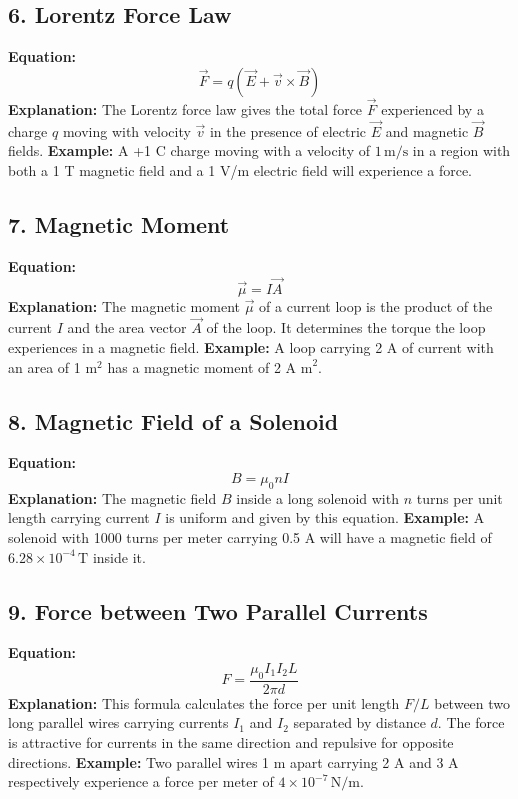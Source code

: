 \documentclass{article}
\begin{document}
\subsection*{6. Lorentz Force Law}
\textbf{Equation:} 
\[ \vec{F} = q(\vec{E} + \vec{v} \times \vec{B}) \]
\textbf{Explanation:} 
The Lorentz force law gives the total force \( \vec{F} \) experienced by a charge \( q \) moving with velocity \( \vec{v} \) in the presence of electric \( \vec{E} \) and magnetic \( \vec{B} \) fields.
\textbf{Example:}
A +1 C charge moving with a velocity of \( 1 \, \text{m/s} \) in a region with both a 1 T magnetic field and a 1 V/m electric field will experience a force.

\subsection*{7. Magnetic Moment}
\textbf{Equation:} 
\[ \vec{\mu} = I\vec{A} \]
\textbf{Explanation:} 
The magnetic moment \( \vec{\mu} \) of a current loop is the product of the current \( I \) and the area vector \( \vec{A} \) of the loop. It determines the torque the loop experiences in a magnetic field.
\textbf{Example:}
A loop carrying 2 A of current with an area of 1 \( \text{m}^2 \) has a magnetic moment of 2 \( \text{A m}^2 \).

\subsection*{8. Magnetic Field of a Solenoid}
\textbf{Equation:} 
\[ B = \mu_0 n I \]
\textbf{Explanation:} 
The magnetic field \( B \) inside a long solenoid with \( n \) turns per unit length carrying current \( I \) is uniform and given by this equation.
\textbf{Example:}
A solenoid with 1000 turns per meter carrying 0.5 A will have a magnetic field of \( 6.28 \times 10^{-4} \, \text{T} \) inside it.

\subsection*{9. Force between Two Parallel Currents}
\textbf{Equation:} 
\[ F = \frac{\mu_0 I_1 I_2 L}{2\pi d} \]
\textbf{Explanation:} 
This formula calculates the force per unit length \( F/L \) between two long parallel wires carrying currents \( I_1 \) and \( I_2 \) separated by distance \( d \). The force is attractive for currents in the same direction and repulsive for opposite directions.
\textbf{Example:}
Two parallel wires 1 m apart carrying 2 A and 3 A respectively experience a force per meter of \( 4 \times 10^{-7} \, \text{N/m} \).
\end{document}

